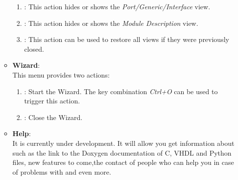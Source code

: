 \begin{enumerate}
\begin{itemize}
\begin{enumerate}
						\item {}: This action hides or shows  the \textit{Port/Generic/Interface} view.
						\item {}: This action hides or shows  the \textit{Module Description} view.
						\item {}: This action can be used to restore all views if they were previously closed.
					\end{enumerate}
				\item \textbf{Wizard}:\\This menu provides two actions:
					\begin{enumerate}
						\item {}: Start the Wizard. The key combination \textit{Ctrl+O} can be used to trigger this action.
						\item {}: Close the Wizard.
					\end{enumerate}
				\item \textbf{Help}: \\It is currently under development. It will allow you get information about \asterics such as the link to the Doxygen documentation of C, VHDL and Python files, new features to come,the contact of people who can help you in case of problems with \asterics and even more.
			\end{itemize}

	\end{enumerate}
